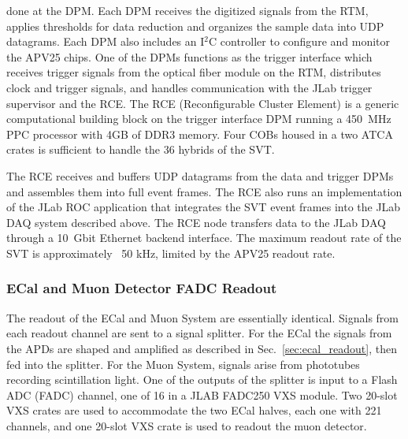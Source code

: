 done at the DPM.  Each DPM receives the digitized signals 
from the RTM, applies thresholds for data reduction and organizes the sample data 
into UDP datagrams. Each DPM also includes an I$^{2}$C controller to configure and monitor the 
APV25 chips. One of the DPMs functions as the trigger interface which receives trigger 
signals from the optical fiber module on the RTM, distributes clock and trigger signals, 
and handles communication with the JLab trigger supervisor and the RCE. The 
RCE (Reconfigurable Cluster Element) is a generic computational building block 
on the trigger interface DPM running a 450~MHz PPC processor with 4GB of DDR3 
memory. Four COBs housed in a two ATCA crates is sufficient to handle 
the 36 hybrids of the SVT.

The RCE receives and buffers UDP datagrams from the data and trigger DPMs and
 assembles them into full event frames. The RCE also runs an implementation of the JLab ROC application 
that integrates the SVT event frames into the JLab DAQ 
 system described above. The RCE node transfers data to the JLab DAQ  
 through a 10~Gbit Ethernet backend interface. The maximum readout rate of the SVT is approximately 
~50 kHz, limited by the APV25 readout rate. 








\subsubsection{ECal and Muon Detector FADC Readout}
\label{sec:fadc_daq}
The readout of the ECal and Muon System are essentially identical. Signals from each 
readout channel are sent to a signal splitter. For the ECal the signals from the APDs are 
shaped and amplified as described in Sec.~\ref{sec:ecal_readout}, then fed into the 
splitter. For the Muon System, signals arise from phototubes recording scintillation light.
One of the outputs of the splitter is input to a 
Flash ADC (FADC) channel, one of 16 in a JLAB FADC250 VXS module. Two 20-slot VXS crates are used to accommodate the two ECal 
halves, each one with 221 channels, and one 20-slot VXS crate is used to readout the muon 
detector. 

